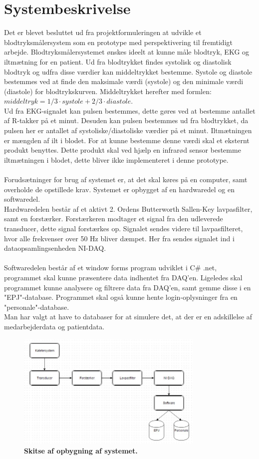 \chapter{Systembeskrivelse}
Det er blevet besluttet ud fra projektformuleringen at udvikle et blodtryksmålersystem som en prototype med perspektivering til fremtidigt arbejde. Blodtryksmålersystemet ønskes ideelt at kunne måle blodtryk, EKG og iltmætning for en patient. Ud fra blodtrykket findes systolisk og diastolisk blodtryk og udfra disse værdier kan middeltrykket bestemme. Systole og diastole bestemmes ved at finde den maksimale værdi (systole) og den minimale værdi (diastole) for blodtrykskurven. Middeltrykket herefter med formlen: $middeltryk = 1/3 \cdot systole + 2/3 \cdot diastole$. \cite{blodtrykwiki}
\\ Ud fra EKG-signalet kan pulsen bestemmes, dette gøres ved at bestemme antallet af R-takker på et minut. Desuden kan pulsen bestemmes ud fra blodtrykket, da pulsen her er antallet af systoliske/diastoliske værdier på et minut. Iltmætningen er mængden af ilt i blodet. For at kunne bestemme denne værdi skal et eksternt produkt benyttes. Dette produkt skal ved hjælp en infrarød sensor bestemme iltmætningen i blodet, dette bliver ikke implementeret i denne prototype.\\\\
Forudsætninger for brug af systemet er, at det skal køres på en computer, samt overholde de opstillede krav. Systemet er opbygget af en hardwaredel og en softwaredel. \\
Hardwaredelen består af et aktivt 2. Ordens Butterworth Sallen-Key lavpasfilter, samt en forstærker. Forstærkeren modtager et signal fra den udleverede transducer, dette signal forstærkes op. Signalet sendes videre til lavpasfilteret, hvor alle frekvenser over 50 Hz bliver dæmpet. Her fra sendes signalet ind i dataopsamlingsenheden NI-DAQ.\\\\
Softwaredelen består af et window forms program udviklet i C\# .net, programmet skal kunne præsentere data indhentet fra DAQ’en. Ligeledes skal programmet kunne analysere og filtrere data fra DAQ’en, samt gemme disse i en "EPJ"-database. Programmet skal også kunne hente login-oplysninger fra en "personale"-database. \\
Man har valgt at have to databaser for at simulere det, at der er en adskillelse af medarbejderdata og patientdata.
\begin{figure}[H]
\includegraphics[width =0.8\textwidth , center]{billeder/system}
\caption{\textbf{Skitse af opbygning af systemet.}}
\end{figure}
